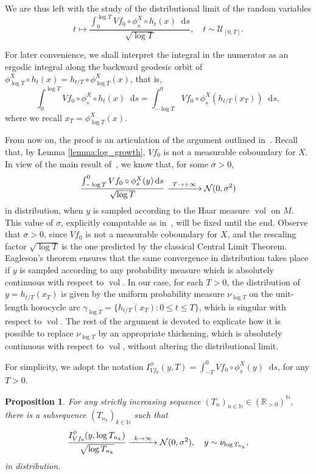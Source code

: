 \documentclass[11pt]{article}
\newcommand\To[1]{\mathchoice{\xrightarrow{\kern4pt#1\kern3pt}}{\stackrel{#1}{\longrightarrow}}{}{}}
\newcommand \R{\mathbb{R}}
\newcommand \N{\mathbb{N}}
\newcommand {\cN}{\mathcal{N}}
\newcommand*{\diff}{\mathop{}\!\mathrm{d}}
\DeclareMathOperator{\vol}{vol}
\newtheorem {proposition}[theorem]{Proposition}
\theoremstyle{definition}
\begin{document}
\begin{appendix}
We are thus left with the study of the distributional limit of the random variables
\begin{equation*}
t\mapsto \frac{\int_0^{\log{T}}Vf_0\circ \phi^{X}_s\circ h_t(x) \diff s}{\sqrt{\log{T}}}, \quad t\sim \mathcal{U}_{[0,T]}.
\end{equation*}

For later convenience, we shall interpret the integral in the numerator as an ergodic integral along the backward geodesic orbit of $\phi_{\log{T}}^{X}\circ h_t(x)=h_{t/T} \circ \phi^{X}_{\log{T}}(x)$, that is,
\begin{equation*}
\int_0^{\log{T}}Vf_0\circ \phi^{X}_s\circ h_t(x) \diff s=\int_{-\log{T}}^{0}Vf_0\circ \phi_s^{X}(h_{t/T}(x_T))\diff s,
\end{equation*}
where we recall $x_T =\phi^{X}_{\log{T}}(x)$.

From now on, the proof is an articulation of the argument outlined in~\cite{Dolgopyat-Sarig}. Recall that, by Lemma \ref{lemma:log_growth}, $Vf_0$ is not a measurable coboundary for $X$. In view of the main result of~\cite{Rat:CLT}, we know that, for some $\sigma >0$,
\begin{equation*}
\frac{\int_{-\log{T}}^{0}Vf_0\circ \phi^{X}_s(y)\diff s}{\sqrt{\log{T}}}\To{T\to+\infty}\cN(0,\sigma^{2})
\end{equation*}
in distribution, when $y$ is sampled according to the Haar measure $\vol$ on $M$. This value of $\sigma$, explicitly computable as in~\cite[Th.\,3.1]{Rat:CLT}, will be fixed until the end.
Observe that $\sigma >0$, since $Vf_0$ is not a measurable coboundary for $X$, and the rescaling factor $\sqrt{\log T}$ is the one predicted by the classical Central Limit Theorem.
Eagleson's theorem \cite{Eagleson} ensures that the same convergence in distribution takes place if $y$ is sampled according to any probability measure which is absolutely continuous with respect to $\vol$. In our case, for each $T>0$, the distribution of $y=h_{t/T}(x_T)$ is given by the uniform probability measure $\nu_{\log{T}}$ on the unit-length horocycle arc $\gamma_{\log{T}}=\{h_{t/T}(x_T):0\leq t\leq T \}$, which is singular with respect to $\vol$. The rest of the argument is devoted to explicate how it is possible to replace $\nu_{\log{T}}$ by an appropriate thickening, which is absolutely continuous with respect to $\vol$, without altering the distributional limit.

For simplicity, we adopt the notation $I_{Vf_0}^{\phi}(y,T)=\int_{-T}^{0}Vf_0\circ \phi^{X}_s(y)\diff s$, for any $T>0$.
\begin{proposition}
\label{thickeningtrick}
For any strictly increasing sequence $(T_n)_{n\in \N}\in (\R_{>0})^{\N}$, there is a subsequence $(T_{n_k})_{k\in \N}$ such that
\begin{equation*}
\frac{I^{\phi}_{Vf_0}(y,\log{T_{n_k}})}{\sqrt{\log{T_{n_k}}}}\To{k\to\infty}\cN(0,\sigma^{2}), \quad y\sim \nu_{\log{T_{n_k}}},
\end{equation*}
in distribution.
\end{proposition}


\end{appendix}
\end{document}
